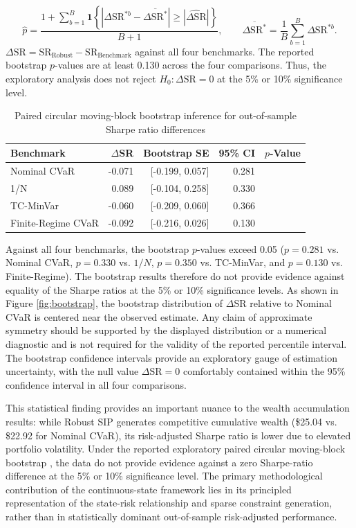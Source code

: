 \documentclass[smallextended]{svjour3}
\begin{document}
\[
\widehat p =
\frac{
1+\sum_{b=1}^{B}
\mathbf 1\!\left\{
\left|
\Delta\mathrm{SR}^{*b}
-\overline{\Delta\mathrm{SR}^{*}}
\right|
\ge
\left|
\widehat{\Delta\mathrm{SR}}
\right|
\right\}
}{B+1},
\qquad
\overline{\Delta\mathrm{SR}^{*}}
=
\frac1B\sum_{b=1}^{B}\Delta\mathrm{SR}^{*b}.
\] $\Delta \text{SR} = \text{SR}_{\text{Robust}} - \text{SR}_{\text{Benchmark}}$ against all four benchmarks. The reported bootstrap $p$-values are at least 0.130 across the four
comparisons. Thus, the exploratory analysis does not reject
$H_0:\Delta\mathrm{SR}=0$ at the 5\% or 10\% significance level.

\begin{table}[htbp]
\centering
\caption{Paired circular moving-block bootstrap inference for out-of-sample Sharpe ratio differences}
\label{tab:bootstrap}
\small
\begin{tabular}{lrrrr}
\toprule
\textbf{Benchmark} & \textbf{$\Delta$SR} & \textbf{Bootstrap SE} & \textbf{95\% CI} & \textbf{$p$-Value} \\
\midrule
Nominal CVaR & -0.071 & [-0.199, 0.057] & 0.281 \\
1/N & 0.089 & [-0.104, 0.258] & 0.330 \\
TC-MinVar & -0.060 & [-0.209, 0.060] & 0.366 \\
Finite-Regime CVaR & -0.092 & [-0.216, 0.026] & 0.130 \\

\bottomrule
\end{tabular}
\end{table}

Against all four benchmarks, the bootstrap $p$-values exceed 0.05 ($p = 0.281$ vs. Nominal CVaR, $p = 0.330$ vs. $1/N$, $p = 0.350$ vs. TC-MinVar, and $p = 0.130$ vs. Finite-Regime). The bootstrap results therefore do not provide evidence against equality of the Sharpe ratios at the 5\% or 10\% significance levels. As shown in Figure \ref{fig:bootstrap}, the bootstrap distribution of $\Delta\mathrm{SR}$ relative to Nominal CVaR
is centered near the observed estimate. Any claim of approximate symmetry
should be supported by the displayed distribution or a numerical diagnostic
and is not required for the validity of the reported percentile interval. The bootstrap confidence intervals provide an exploratory gauge of estimation uncertainty, with the null value $\Delta \text{SR} = 0$ comfortably contained within the 95\% confidence interval in all four comparisons.

This statistical finding provides an important nuance to the wealth accumulation results: while Robust SIP generates competitive cumulative wealth (\$25.04 vs. \$22.92 for Nominal CVaR), its risk-adjusted Sharpe ratio is lower due to elevated portfolio volatility. Under the reported exploratory paired circular moving-block bootstrap \cite{politis1992circular}, the
data do not provide evidence against a zero Sharpe-ratio difference at the
5\% or 10\% significance level. The primary methodological contribution of the continuous-state framework lies in its principled representation of the state-risk relationship and sparse constraint generation, rather than in statistically dominant out-of-sample risk-adjusted performance.
\end{document}
